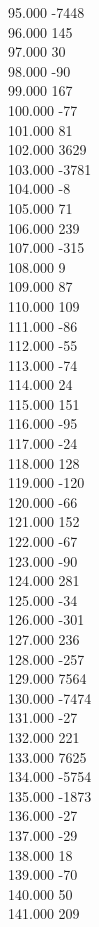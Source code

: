 { 95.000	-7448 \\
 96.000	145 \\
 97.000	30 \\
 98.000	-90 \\
 99.000	167 \\
 100.000	-77 \\
 101.000	81 \\
 102.000	3629 \\
 103.000	-3781 \\
 104.000	-8 \\
 105.000	71 \\
 106.000	239 \\
 107.000	-315 \\
 108.000	9 \\
 109.000	87 \\
 110.000	109 \\
 111.000	-86 \\
 112.000	-55 \\
 113.000	-74 \\
 114.000	24 \\
 115.000	151 \\
 116.000	-95 \\
 117.000	-24 \\
 118.000	128 \\
 119.000	-120 \\
 120.000	-66 \\
 121.000	152 \\
 122.000	-67 \\
 123.000	-90 \\
 124.000	281 \\
 125.000	-34 \\
 126.000	-301 \\
 127.000	236 \\
 128.000	-257 \\
 129.000	7564 \\
 130.000	-7474 \\
 131.000	-27 \\
 132.000	221 \\
 133.000	7625 \\
 134.000	-5754 \\
 135.000	-1873 \\
 136.000	-27 \\
 137.000	-29 \\
 138.000	18 \\
 139.000	-70 \\
 140.000	50 \\
 141.000	209 \\
}
